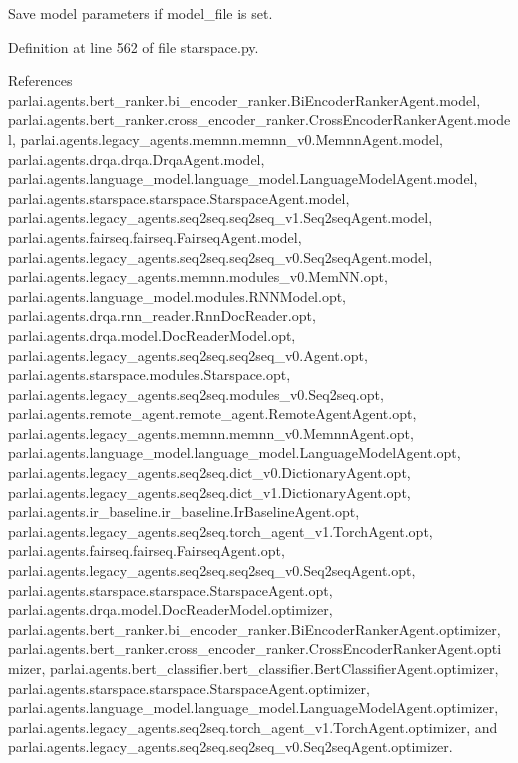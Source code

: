 \begin{DoxyVerb}Save model parameters if model_file is set.\end{DoxyVerb}
 

Definition at line 562 of file starspace.\+py.



References parlai.\+agents.\+bert\+\_\+ranker.\+bi\+\_\+encoder\+\_\+ranker.\+Bi\+Encoder\+Ranker\+Agent.\+model, parlai.\+agents.\+bert\+\_\+ranker.\+cross\+\_\+encoder\+\_\+ranker.\+Cross\+Encoder\+Ranker\+Agent.\+model, parlai.\+agents.\+legacy\+\_\+agents.\+memnn.\+memnn\+\_\+v0.\+Memnn\+Agent.\+model, parlai.\+agents.\+drqa.\+drqa.\+Drqa\+Agent.\+model, parlai.\+agents.\+language\+\_\+model.\+language\+\_\+model.\+Language\+Model\+Agent.\+model, parlai.\+agents.\+starspace.\+starspace.\+Starspace\+Agent.\+model, parlai.\+agents.\+legacy\+\_\+agents.\+seq2seq.\+seq2seq\+\_\+v1.\+Seq2seq\+Agent.\+model, parlai.\+agents.\+fairseq.\+fairseq.\+Fairseq\+Agent.\+model, parlai.\+agents.\+legacy\+\_\+agents.\+seq2seq.\+seq2seq\+\_\+v0.\+Seq2seq\+Agent.\+model, parlai.\+agents.\+legacy\+\_\+agents.\+memnn.\+modules\+\_\+v0.\+Mem\+N\+N.\+opt, parlai.\+agents.\+language\+\_\+model.\+modules.\+R\+N\+N\+Model.\+opt, parlai.\+agents.\+drqa.\+rnn\+\_\+reader.\+Rnn\+Doc\+Reader.\+opt, parlai.\+agents.\+drqa.\+model.\+Doc\+Reader\+Model.\+opt, parlai.\+agents.\+legacy\+\_\+agents.\+seq2seq.\+seq2seq\+\_\+v0.\+Agent.\+opt, parlai.\+agents.\+starspace.\+modules.\+Starspace.\+opt, parlai.\+agents.\+legacy\+\_\+agents.\+seq2seq.\+modules\+\_\+v0.\+Seq2seq.\+opt, parlai.\+agents.\+remote\+\_\+agent.\+remote\+\_\+agent.\+Remote\+Agent\+Agent.\+opt, parlai.\+agents.\+legacy\+\_\+agents.\+memnn.\+memnn\+\_\+v0.\+Memnn\+Agent.\+opt, parlai.\+agents.\+language\+\_\+model.\+language\+\_\+model.\+Language\+Model\+Agent.\+opt, parlai.\+agents.\+legacy\+\_\+agents.\+seq2seq.\+dict\+\_\+v0.\+Dictionary\+Agent.\+opt, parlai.\+agents.\+legacy\+\_\+agents.\+seq2seq.\+dict\+\_\+v1.\+Dictionary\+Agent.\+opt, parlai.\+agents.\+ir\+\_\+baseline.\+ir\+\_\+baseline.\+Ir\+Baseline\+Agent.\+opt, parlai.\+agents.\+legacy\+\_\+agents.\+seq2seq.\+torch\+\_\+agent\+\_\+v1.\+Torch\+Agent.\+opt, parlai.\+agents.\+fairseq.\+fairseq.\+Fairseq\+Agent.\+opt, parlai.\+agents.\+legacy\+\_\+agents.\+seq2seq.\+seq2seq\+\_\+v0.\+Seq2seq\+Agent.\+opt, parlai.\+agents.\+starspace.\+starspace.\+Starspace\+Agent.\+opt, parlai.\+agents.\+drqa.\+model.\+Doc\+Reader\+Model.\+optimizer, parlai.\+agents.\+bert\+\_\+ranker.\+bi\+\_\+encoder\+\_\+ranker.\+Bi\+Encoder\+Ranker\+Agent.\+optimizer, parlai.\+agents.\+bert\+\_\+ranker.\+cross\+\_\+encoder\+\_\+ranker.\+Cross\+Encoder\+Ranker\+Agent.\+optimizer, parlai.\+agents.\+bert\+\_\+classifier.\+bert\+\_\+classifier.\+Bert\+Classifier\+Agent.\+optimizer, parlai.\+agents.\+starspace.\+starspace.\+Starspace\+Agent.\+optimizer, parlai.\+agents.\+language\+\_\+model.\+language\+\_\+model.\+Language\+Model\+Agent.\+optimizer, parlai.\+agents.\+legacy\+\_\+agents.\+seq2seq.\+torch\+\_\+agent\+\_\+v1.\+Torch\+Agent.\+optimizer, and parlai.\+agents.\+legacy\+\_\+agents.\+seq2seq.\+seq2seq\+\_\+v0.\+Seq2seq\+Agent.\+optimizer.



